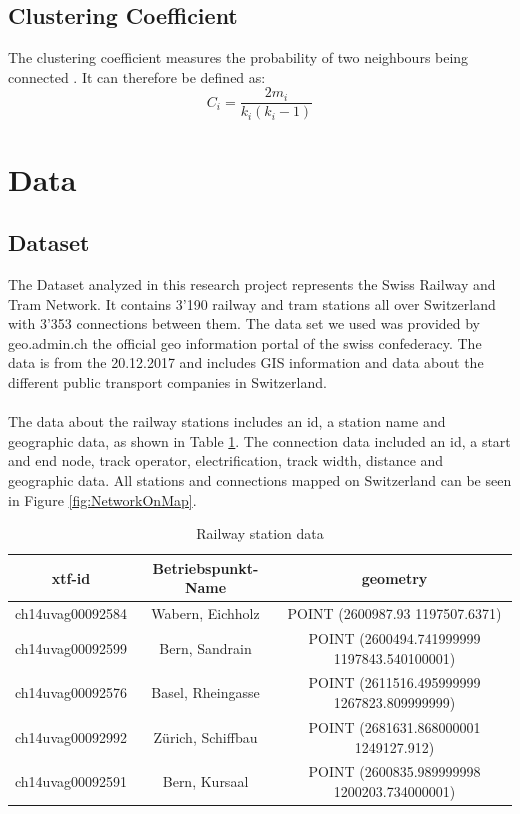 \documentclass{Resources/netsci-project}
\begin{document}
\subsection{Clustering Coefficient}
The clustering coefficient measures the probability of two neighbours being connected \autocite{ComplexTopology}. It can therefore be defined as:
\begin{equation} \label{eqRestMass}
C_{i} =\dfrac{2m_i}{k_i(k_i -1)}
\end{equation}

\section{Data}
\subsection{Dataset}
The Dataset analyzed in this research project represents the Swiss Railway and Tram Network. It contains 3’190 railway and tram stations all over Switzerland with 3'353 connections between them. The data set we used was provided by geo.admin.ch the official geo information portal of the swiss confederacy. The data is from the 20.12.2017 and includes GIS information and data about the different public transport companies in Switzerland. \autocite{Dataset}
\\~\\
The data about the railway stations includes an id, a station name and geographic data, as shown in Table \ref{tbl:RailwayStationData}. The connection data included an id, a start and end node, track operator, electrification, track width, distance and geographic data. All stations and connections mapped on Switzerland can be seen in Figure \ref{fig:NetworkOnMap}.

\begin{table}[H]
\centering
\begin{tabular}{c c c }
\hline 
xtf-id & Betriebspunkt-Name &  geometry\\ 
\hline 
ch14uvag00092584 & Wabern, Eichholz & POINT (2600987.93 1197507.6371) \\
ch14uvag00092599 & Bern, Sandrain & POINT (2600494.741999999 1197843.540100001) \\
ch14uvag00092576 & Basel, Rheingasse & POINT (2611516.495999999 1267823.809999999) \\
ch14uvag00092992 & Zürich, Schiffbau & POINT (2681631.868000001 1249127.912) \\
ch14uvag00092591 & Bern, Kursaal & POINT (2600835.989999998 1200203.734000001) \\
\hline 
\end{tabular}
\caption{Railway station data}
\label{tbl:RailwayStationData}
\end{table}
\end{document}
